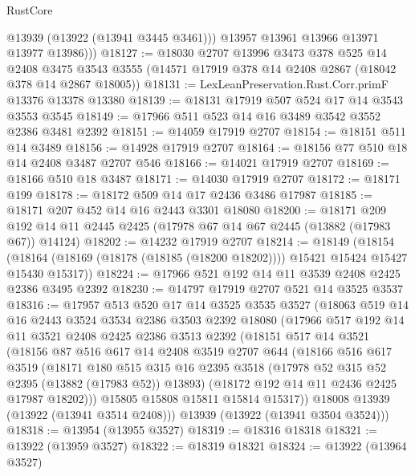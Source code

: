 \begin{lexlean}{RustCore}
\begin{coremodule}
            @13939
            (@13922 (@13941 @3445 @3461)))
          @13957
          @13961
          @13966
          @13971
          @13977
          @13986)))
@18127 := @18030
    @2707
    @13996
    @3473
    @378
    @525
    @14
    @2408
    @3475
    @3543
    @3555
    (@14571 @17919 @378 @14 @2408 @2867 (@18042 @378 @14 @2867 @18005))
@18131 := LexLeanPreservation.Rust.Corr.primF @13376 @13378 @13380
@18139 := @18131 @17919 @507 @524 @17 @14 @3543 @3553 @3545
@18149 := @17966 @511 @523 @14 @16 @3489 @3542 @3552 @2386 @3481 @2392
@18151 := @14059 @17919 @2707
@18154 := @18151 @511 @14 @3489
@18156 := @14928 @17919 @2707
@18164 := @18156 @77 @510 @18 @14 @2408 @3487 @2707 @546
@18166 := @14021 @17919 @2707
@18169 := @18166 @510 @18 @3487
@18171 := @14030 @17919 @2707
@18172 := @18171 @199
@18178 := @18172 @509 @14 @17 @2436 @3486 @17987
@18185 := @18171 @207 @452 @14 @16 @2443 @3301 @18080
@18200 := @18171
    @209
    @192
    @14
    @11
    @2445
    @2425
    (@17978 @67 @14 @67 @2445 (@13882 (@17983 @67)) @14124)
@18202 := @14232 @17919 @2707
@18214 := @18149
    (@18154 (@18164 (@18169 (@18178 (@18185 (@18200 @18202)))) @15421 @15424 @15427 @15430 @15317))
@18224 := @17966 @521 @192 @14 @11 @3539 @2408 @2425 @2386 @3495 @2392
@18230 := @14797 @17919 @2707 @521 @14 @3525 @3537
@18316 := @17957
    @513
    @520
    @17
    @14
    @3525
    @3535
    @3527
    (@18063
      @519
      @14
      @16
      @2443
      @3524
      @3534
      @2386
      @3503
      @2392
      @18080
      (@17966
        @517
        @192
        @14
        @11
        @3521
        @2408
        @2425
        @2386
        @3513
        @2392
        (@18151
          @517
          @14
          @3521
          (@18156
            @87
            @516
            @617
            @14
            @2408
            @3519
            @2707
            @644
            (@18166
              @516
              @617
              @3519
              (@18171
                @180
                @515
                @315
                @16
                @2395
                @3518
                (@17978 @52 @315 @52 @2395 (@13882 (@17983 @52)) @13893)
                (@18172 @192 @14 @11 @2436 @2425 @17987 @18202)))
            @15805
            @15808
            @15811
            @15814
            @15317))
        @18008
        @13939
        (@13922 (@13941 @3514 @2408)))
      @13939
      (@13922 (@13941 @3504 @3524)))
@18318 := @13954 (@13955 @3527)
@18319 := @18316 @18318
@18321 := @13922 (@13959 @3527)
@18322 := @18319 @18321
@18324 := @13922 (@13964 @3527)

\end{coremodule}
\end{lexlean}
